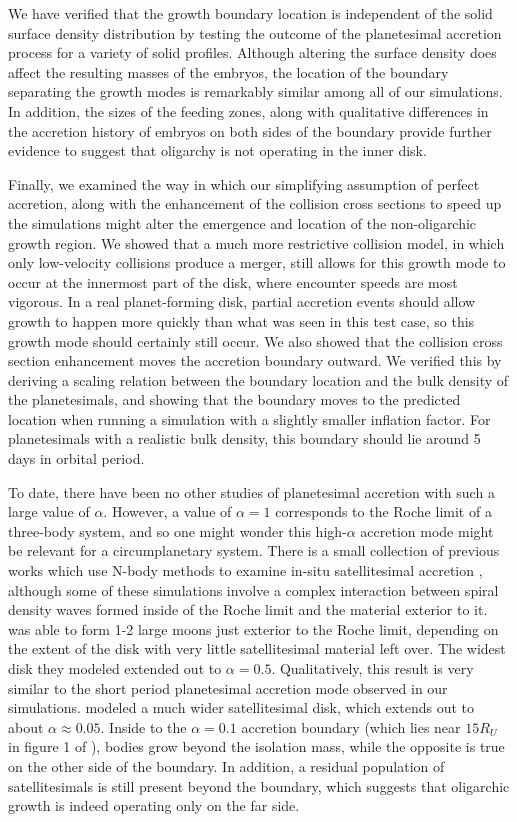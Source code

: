 \documentclass[twocolumn]{aastex63}
\begin{document}
We have verified that the growth boundary location is independent of the
solid surface density distribution by testing the outcome of the planetesimal
accretion process for a variety of solid
profiles. Although altering the surface density does affect the
resulting masses of the embryos, the location of the boundary
separating the growth modes is remarkably similar among all of our simulations.
In addition, the sizes of the feeding zones, along with qualitative differences in the
accretion history of embryos on both sides of the boundary provide further evidence to
suggest that oligarchy is not operating in the inner disk.

Finally, we examined the way in which our simplifying assumption of perfect accretion, along with the enhancement of the 
collision cross sections to speed up the simulations might alter the emergence and location of the non-oligarchic growth region. 
We showed that a much more restrictive collision model, in which only low-velocity collisions produce a merger, still allows for 
this growth mode to occur at the innermost part of the disk, where encounter speeds are most vigorous. In a real planet-forming 
disk, partial accretion events should allow growth to happen more quickly than what was seen in this test case, so this growth 
mode should certainly still occur. We also showed that the collision cross section enhancement moves the accretion boundary 
outward. We verified this by deriving a scaling relation between the boundary location and the bulk density of the planetesimals, 
and showing that the boundary moves to the predicted location when running a simulation with a slightly smaller inflation factor. 
For planetesimals with a realistic bulk density, this boundary should lie around 5 days in orbital period.

To date, there have been no other studies of planetesimal accretion
with such a large value of $\alpha$. However, a value of $\alpha = 1$
corresponds to the Roche limit of a three-body system, and so one
might wonder this high-$\alpha$ accretion mode might be relevant for a
circumplanetary system. There is a small collection of previous works
which use N-body methods to examine in-situ satellitesimal accretion
\citep{ida97, richardson00, kokubo00b, ida20}, although some of these simulations involve a complex interaction between spiral 
density waves formed inside of the Roche limit and the material exterior to it. \citet{ida97} was able to form 1-2
large moons just exterior to the Roche limit, depending on the extent of the disk with very little satellitesimal material left over. 
The widest disk they modeled extended out to $\alpha = 0.5$. Qualitatively, this result is very similar to the short period 
planetesimal accretion mode observed in our simulations. \citet{ida20} modeled a much wider satellitesimal disk, which extends 
out to about $\alpha \approx 0.05$. Inside to the $\alpha = 0.1$ accretion boundary (which lies near $15 R_{U}$ in figure 1 of 
\citet{ida20}), bodies grow beyond the isolation mass, while the opposite is true on the other side of the boundary. In addition, a 
residual population of satellitesimals is still present beyond the boundary, which suggests that oligarchic growth is indeed 
operating only on the far side.
\end{document}
